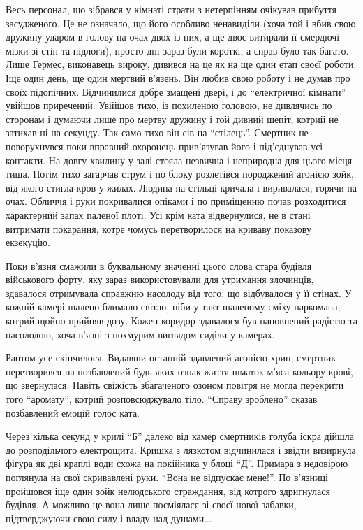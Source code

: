 \documentclass[a4paper,oneside]{book}
\begin{document}
 
Весь персонал, що зібрався у кімнаті страти з нетерпінням очікував прибуття
засудженого. Це не означало, що його особливо ненавиділи (хоча той і вбив свою
дружину ударом в голову на очах двох із них, а ще двоє витирали її смердючі
мізки зі стін та підлоги), просто дні зараз були короткі, а справ було так
багато. Лише Гермес, виконавець вироку, дивився на це як на ще один етап своєї
роботи. Іще один день, ще один мертвий в’язень. Він любив свою роботу і не
думав про своїх підопічних. Відчинилися добре змащені двері, і до “електричної
кімнати” увійшов приречений. Увійшов тихо, із похиленою головою, не дивлячись
по сторонам і думаючи лише про мертву дружину і той дивний шепіт, котрий не
затихав ні на секунду. Так само тихо він сів на “стілець”. Смертник не
поворухнувся поки вправний охоронець прив’язував його і під’єднував усі
контакти. На довгу хвилину у залі стояла незвична і неприродна для цього місця
тиша. Потім тихо загарчав струм і по блоку розлетівся породжений агонією зойк,
від якого стигла кров у жилах. Людина на стільці кричала і виривалася, горячи
на очах. Обличчя і руки покривалися опіками і по приміщенню почав розходитися
характерний запах  паленої плоті. Усі крім ката відвернулися, не в стані
витримати покарання, котре чомусь перетворилося на криваву показову екзекуцію.

Поки в’язня смажили в буквальному значенні цього слова стара будівля
військового форту, яку зараз використовували для утримання злочинців,
здавалося отримувала справжню насолоду від того, що відбувалося у її стінах. У
кожній камері шалено блимало світло, ніби у такт шаленому сміху наркомана,
котрий щойно прийняв дозу. Кожен коридор здавалося був наповнений радістю та
насолодою, хоча в’язні з похмурим виглядом сиділи у камерах.

Раптом усе скінчилося. Видавши останній здавлений агонією хрип, смертник
перетворився на позбавлений будь-яких ознак життя шматок м’яса кольору крові,
що звернулася. Навіть свіжість збагаченого озоном повітря не могла перекрити
того “аромату”, котрий розповсюджувало тіло. “Справу зроблено” сказав
позбавлений емоцій голос ката.

Через кілька секунд у крилі “Б” далеко від камер смертників голуба іскра
дійшла до розподільчого електрощита. Кришка з лязкотом відчинилася і звідти
визирнула фігура як дві краплі води схожа на покійника у блоці “Д”. Примара з
недовірою поглянула на свої скривавлені руки. “Вона не відпускає мене!”. По
в’язниці пройшовся іще один зойк нелюдського страждання, від котрого
здригнулася будівля. А можливо це вона лише посміялася зі своєї нової забавки,
підтверджуючи свою силу і владу над душами...
\end{document}
